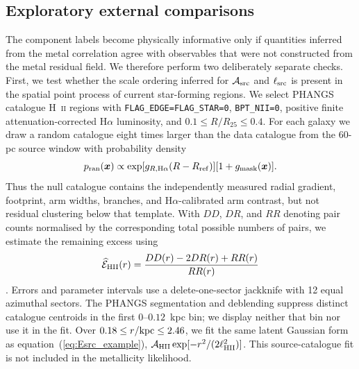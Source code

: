 \documentclass[fleqn,usenatbib]{mnras}
\newcommand{\bs}[1]{\boldsymbol{#1}}
\begin{document}
\subsection{Exploratory external comparisons}
\label{ssec:phangs_physical_checks}

The component labels become physically informative only if quantities inferred from the metal correlation agree with observables that were not constructed from the metal residual field.  We therefore perform two deliberately separate checks.  First, we test whether the scale ordering inferred for ${\cal A}_{\rm src}$ and $\ell_{\rm src}$ is present in the spatial point process of current star-forming regions.  We select PHANGS catalogue H~\textsc{ii} regions with \texttt{FLAG\_EDGE=FLAG\_STAR=0}, \texttt{BPT\_NII=0}, positive finite attenuation-corrected H$\alpha$ luminosity, and $0.1\leq R/R_{25}\leq0.4$.  For each galaxy we draw a random catalogue eight times larger than the data catalogue from the 60-pc source window with probability density
\begin{equation}
    p_{\rm ran}(\bs{x})\propto
    \exp[g_{R,{\rm H}\alpha}(R-R_{\rm ref})]
    [1+g_{\rm mask}(\bs{x})].
    \label{eq:phangs_hii_random_intensity}
\end{equation}
Thus the null catalogue contains the independently measured radial gradient, footprint, arm widths, branches, and H$\alpha$-calibrated arm contrast, but not residual clustering below that template.  With $DD$, $DR$, and $RR$ denoting pair counts normalised by the corresponding total possible numbers of pairs, we estimate the remaining excess using
\begin{equation}
    \widehat{\mathcal E}_{\rm HII}(r)
    =\frac{DD(r)-2DR(r)+RR(r)}{RR(r)}
    \label{eq:phangs_hii_landy_szalay}
\end{equation}
\citep{LandySzalay1993}.  Errors and parameter intervals use a delete-one-sector jackknife with 12 equal azimuthal sectors.  The PHANGS segmentation and deblending suppress distinct catalogue centroids in the first $0$--$0.12$~kpc bin; we display neither that bin nor use it in the fit.  Over $0.18\leq r/{\rm kpc}\leq2.46$, we fit the same latent Gaussian form as equation~(\ref{eq:Esrc_example}), ${\cal A}_{\rm HII}\exp[-r^2/(2\ell_{\rm HII}^2)]$.  This source-catalogue fit is not included in the metallicity likelihood.
\end{document}
